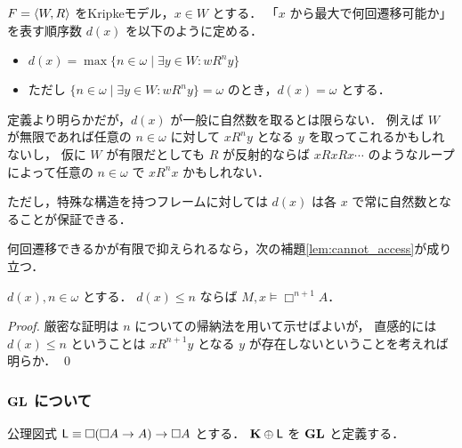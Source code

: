 \documentclass{jsarticle}
\begin{document}
\begin{definition}
	$F = \langle W, R \rangle$ をKripkeモデル，$x \in W$ とする．
	「$x$ から最大で何回遷移可能か」を表す順序数 $d(x)$ を以下のように定める．
	\begin{itemize}
		\item $d(x) = \max \{ n \in \omega \mid \exists y \in W \colon w R^n y \}$
		\item ただし $\{ n \in \omega \mid \exists y \in W \colon w R^n y \} = \omega$ のとき，$d(x) = \omega$ とする．
	\end{itemize}
\end{definition}

\begin{remark}
	定義より明らかだが，$d(x)$ が一般に自然数を取るとは限らない．
	例えば $W$ が無限であれば任意の $n \in \omega$ に対して $x R^n y$ となる $y$ を取ってこれるかもしれないし，
	仮に $W$ が有限だとしても $R$ が反射的ならば $x R x R x \cdots$ のようなループによって任意の $n \in \omega$ で $x R^n x$ かもしれない．

	ただし，特殊な構造を持つフレームに対しては $d(x)$ は各 $x$ で常に自然数となることが保証できる．
\end{remark}

何回遷移できるかが有限で抑えられるなら，次の補題\ref{lem:cannot_access}が成り立つ．

\begin{lemma}\label{lem:cannot_access}
	$d(x), n \in \omega$ とする．
	$d(x) \leq n$ ならば $M,x \vDash \Box^{n + 1} A$．
\end{lemma}

\begin{proof}
	厳密な証明は $n$ についての帰納法を用いて示せばよいが，
	直感的には $d(x) \leq n$ ということは $x R^{n + 1} y$ となる $y$ が存在しないということを考えれば明らか．
	\qed
\end{proof}

\subsubsection{$\LogicGL$ について}

\begin{definition}
	公理図式 $\mathsf{L} \equiv \Box(\Box A \to A) \to \Box A$ とする．\index{$\AxL$}
	$\mathbf{K} \oplus \mathsf{L}$ を $\LogicGL$ と定義する．\index{$\LogicGL$}
\end{definition}
\end{document}

